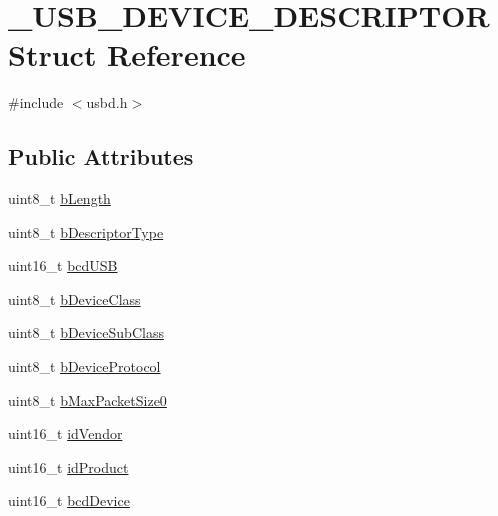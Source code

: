 \hypertarget{struct___u_s_b___d_e_v_i_c_e___d_e_s_c_r_i_p_t_o_r}{}\section{\+\_\+\+U\+S\+B\+\_\+\+D\+E\+V\+I\+C\+E\+\_\+\+D\+E\+S\+C\+R\+I\+P\+T\+OR Struct Reference}
\label{struct___u_s_b___d_e_v_i_c_e___d_e_s_c_r_i_p_t_o_r}


{\ttfamily \#include $<$usbd.\+h$>$}

\subsection*{Public Attributes}
\begin{DoxyCompactItemize}
\item 
uint8\+\_\+t \hyperlink{struct___u_s_b___d_e_v_i_c_e___d_e_s_c_r_i_p_t_o_r_abbf2ba0b5987152cf5c91483532ad3ea}{b\+Length}
\item 
uint8\+\_\+t \hyperlink{struct___u_s_b___d_e_v_i_c_e___d_e_s_c_r_i_p_t_o_r_a215d38dc7e431cb5322fecbbf6e704b8}{b\+Descriptor\+Type}
\item 
uint16\+\_\+t \hyperlink{struct___u_s_b___d_e_v_i_c_e___d_e_s_c_r_i_p_t_o_r_a962b24ee0aca162348882e358f71e435}{bcd\+U\+SB}
\item 
uint8\+\_\+t \hyperlink{struct___u_s_b___d_e_v_i_c_e___d_e_s_c_r_i_p_t_o_r_a09501eb90ffb8bdc6f48fe47805186a4}{b\+Device\+Class}
\item 
uint8\+\_\+t \hyperlink{struct___u_s_b___d_e_v_i_c_e___d_e_s_c_r_i_p_t_o_r_a1281b5e762564a0e3ee47bf6baba2596}{b\+Device\+Sub\+Class}
\item 
uint8\+\_\+t \hyperlink{struct___u_s_b___d_e_v_i_c_e___d_e_s_c_r_i_p_t_o_r_a5e1d87e4f157ba11e93095f7e706a27e}{b\+Device\+Protocol}
\item 
uint8\+\_\+t \hyperlink{struct___u_s_b___d_e_v_i_c_e___d_e_s_c_r_i_p_t_o_r_a8c0e4a758c636b1d8a6070743fabd267}{b\+Max\+Packet\+Size0}
\item 
uint16\+\_\+t \hyperlink{struct___u_s_b___d_e_v_i_c_e___d_e_s_c_r_i_p_t_o_r_ab46b661d76dd87692152bec0acee08ac}{id\+Vendor}
\item 
uint16\+\_\+t \hyperlink{struct___u_s_b___d_e_v_i_c_e___d_e_s_c_r_i_p_t_o_r_ae843ec499f2a7a78cb2e879c1c2764bc}{id\+Product}
\item 
uint16\+\_\+t \hyperlink{struct___u_s_b___d_e_v_i_c_e___d_e_s_c_r_i_p_t_o_r_a539ab3e3270f16d71310604f954b7d5a}{bcd\+Device}

\end{DoxyCompactItemize}
